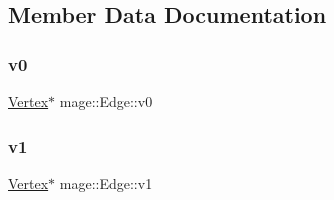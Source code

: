 \subsection{Member Data Documentation}
\hypertarget{structmage_1_1_edge_a2558fb174f3d4cbf4b4732604236ec10}{}\label{structmage_1_1_edge_a2558fb174f3d4cbf4b4732604236ec10} 
\subsubsection{\texorpdfstring{v0}{v0}}
{\footnotesize\ttfamily \hyperlink{structmage_1_1_vertex}{Vertex}$\ast$ mage\+::\+Edge\+::v0}

\hypertarget{structmage_1_1_edge_a10072b2b5d8897431d0e4beb6eaf1ad1}{}\label{structmage_1_1_edge_a10072b2b5d8897431d0e4beb6eaf1ad1} 
\subsubsection{\texorpdfstring{v1}{v1}}
{\footnotesize\ttfamily \hyperlink{structmage_1_1_vertex}{Vertex}$\ast$ mage\+::\+Edge\+::v1}

